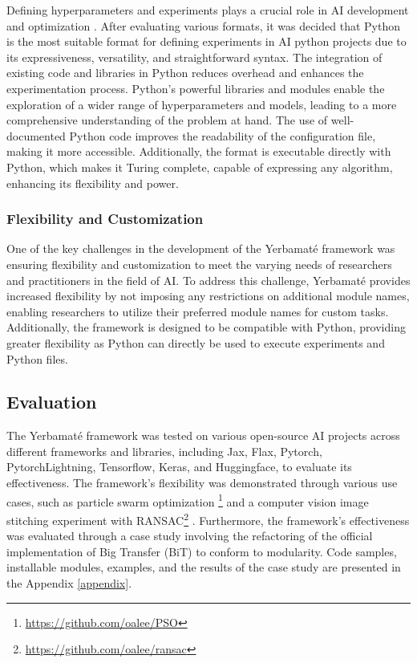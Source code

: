 Defining hyperparameters and experiments plays a crucial role in AI development and optimization \cite{wu2019hyperparameter}. After evaluating various formats, it was decided that Python is the most suitable format for defining experiments in AI python projects due to its expressiveness, versatility, and straightforward syntax. The integration of existing code and libraries in Python reduces overhead and enhances the experimentation process. Python's powerful libraries and modules enable the exploration of a wider range of hyperparameters and models, leading to a more comprehensive understanding of the problem at hand. The use of well-documented Python code improves the readability of the configuration file, making it more accessible. Additionally, the format is executable directly with Python, which makes it Turing complete, capable of expressing any algorithm, enhancing its flexibility and power.


\subsubsection{Flexibility and Customization}

One of the key challenges in the development of the Yerbamaté framework was ensuring flexibility and customization to meet the varying needs of researchers and practitioners in the field of AI. To address this challenge, Yerbamaté provides increased flexibility by not imposing any restrictions on additional module names, enabling researchers to utilize their preferred module names for custom tasks. Additionally, the framework is designed to be compatible with Python, providing greater flexibility as Python can directly be used to execute experiments and Python files.

\subsection{Evaluation}

The Yerbamaté framework was tested on various open-source AI projects across different frameworks and libraries, including Jax, Flax, Pytorch, Pytorch\-Lightning, Tensorflow, Keras, and Huggingface, to evaluate its effectiveness. The framework's flexibility was demonstrated through various use cases, such as particle swarm optimization \footnote{\url{https://github.com/oalee/PSO}}\cite{kennedy1995particle} and a computer vision image stitching experiment with RANSAC\footnote{\url{https://github.com/oalee/ransac}} \cite{lowe2004distinctive}. Furthermore, the framework's effectiveness was evaluated through a case study involving the refactoring of the official implementation of Big Transfer (BiT) to conform to modularity. Code samples, installable modules, examples, and the results of the case study are presented in the Appendix \ref{appendix}.
